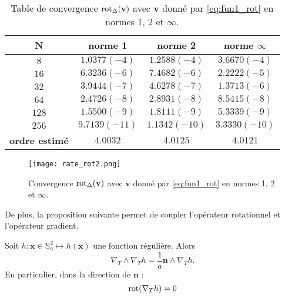 \begin{table}[htbp]
\begin{center}
\begin{tabular}{|c||c|c|c|}
\hline
\textbf{N}  & \textbf{norme 1} & \textbf{norme 2} & \textbf{norme $\infty$} \\
\hline
\hline
$8$  & $1.0377(-4)$  & $1.2588(-4)$  & $3.6670(-4)$  \\
$16$ & $6.3236(-6)$  & $7.4682(-6)$  & $2.2222(-5)$  \\
$32$ & $3.9444(-7)$  & $4.6278(-7)$  & $1.3713(-6)$  \\
$64$ & $2.4726(-8)$  & $2.8931(-8)$  & $8.5415(-8)$  \\
$128$& $1.5500(-9)$  & $1.8111(-9)$  & $5.3339(-9)$  \\
$256$& $9.7139(-11)$ & $1.1342(-10)$ & $3.3330(-10)$ \\
\hline 
\hline
\textbf{ordre estimé}& $4.0032$ & $4.0125$ & $4.0121$\\
\hline
\end{tabular}
\end{center}
\caption{Table de convergence $\text{rot}_{\Delta} ( \mathbf{v} )$ avec $\mathbf{v}$ donné par \eqref{eq:fun1_rot} en normes 1, 2 et $\infty$.}
\label{tab:rate_rot2}
\end{table} 

\begin{figure}[htbp]
\begin{center}
\texttt{[image: rate\_rot2.png]}
\end{center}
\caption{Convergence $\text{rot}_{\Delta} ( \mathbf{v} )$ avec $\mathbf{v}$ donné par \eqref{eq:fun1_rot} en normes 1, 2 et $\infty$.}
\label{fig:rate_rot2}
\end{figure}
























De plus, la proposition suivante permet de coupler l'opérateur rotationnel et l'opérateur gradient.

\begin{proposition}
Soit $h : \mathbf{x} \in \mathbb{S}_a^2 \mapsto h(\mathbf{x})$ une fonction régulière. Alors 
\begin{equation}
\nabla_T \wedge \nabla_T h = \dfrac{1}{a} \mathbf{n} \wedge \nabla_T h.
\end{equation}
En particulier, dans la direction de $\mathbf{n}$ :
\begin{equation}
\text{rot}(\nabla_T h) = 0
\end{equation}
\label{prop:vort_grad}
\end{proposition}


